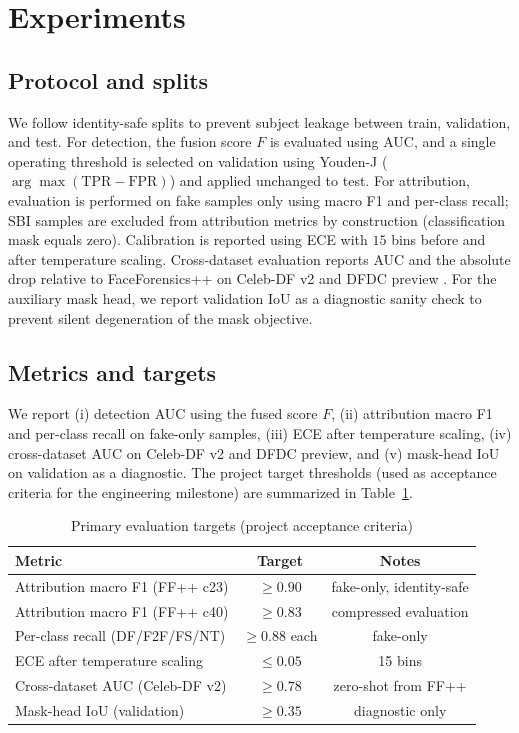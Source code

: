 \documentclass[conference]{IEEEtran}
\begin{document}
\section{Experiments}
\subsection{Protocol and splits}
We follow identity-safe splits to prevent subject leakage between train, validation, and test. For detection, the fusion score $F$ is evaluated using AUC, and a single operating threshold is selected on validation using Youden-J ($\arg\max(\mathrm{TPR}-\mathrm{FPR})$) and applied unchanged to test. For attribution, evaluation is performed on fake samples only using macro F1 and per-class recall; SBI samples are excluded from attribution metrics by construction (classification mask equals zero). Calibration is reported using ECE with $15$ bins before and after temperature scaling. Cross-dataset evaluation reports AUC and the absolute drop relative to FaceForensics++ on Celeb-DF v2 \cite{CelebDF2020} and DFDC preview \cite{DFDC2020}. For the auxiliary mask head, we report validation IoU as a diagnostic sanity check to prevent silent degeneration of the mask objective.

\subsection{Metrics and targets}
We report (i) detection AUC using the fused score $F$, (ii) attribution macro F1 and per-class recall on fake-only samples, (iii) ECE after temperature scaling, (iv) cross-dataset AUC on Celeb-DF v2 and DFDC preview, and (v) mask-head IoU on validation as a diagnostic. The project target thresholds (used as acceptance criteria for the engineering milestone) are summarized in Table~\ref{tab:targets}.

\begin{table}[t]
\caption{Primary evaluation targets (project acceptance criteria)}
\label{tab:targets}
\centering
\begin{tabular}{@{}lcc@{}}
\toprule
Metric & Target & Notes \\ \midrule
Attribution macro F1 (FF++ c23) & $\ge 0.90$ & fake-only, identity-safe \\
Attribution macro F1 (FF++ c40) & $\ge 0.83$ & compressed evaluation \\
Per-class recall (DF/F2F/FS/NT) & $\ge 0.88$ each & fake-only \\
ECE after temperature scaling & $\le 0.05$ & 15 bins \\
Cross-dataset AUC (Celeb-DF v2) & $\ge 0.78$ & zero-shot from FF++ \\
Mask-head IoU (validation) & $\ge 0.35$ & diagnostic only \\
\bottomrule
\end{tabular}
\end{table}
\end{document}
